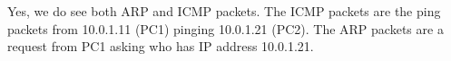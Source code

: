 Yes, we do see both ARP and ICMP packets. The ICMP packets are the ping packets from 10.0.1.11 (PC1) pinging 10.0.1.21 (PC2). The ARP packets are a request from PC1 asking who has IP address 10.0.1.21.